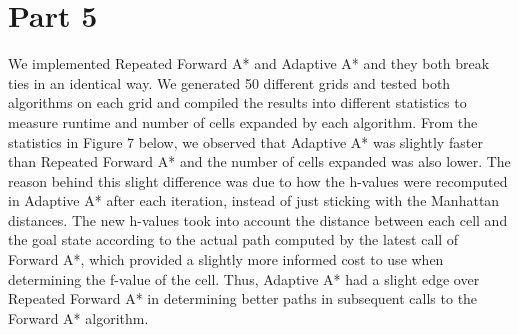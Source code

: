 \documentclass[12pt, letterpaper]{article}
\begin{document}
\section*{Part 5}
We implemented Repeated Forward A* and Adaptive A* and they both break ties in an identical way. We generated 50 different grids and tested both algorithms on each grid and compiled the results into different statistics to measure runtime and number of cells expanded by each algorithm. From the statistics in Figure 7 below, we observed that Adaptive A* was slightly faster than Repeated Forward A* and the number of cells expanded was also lower. The reason behind this slight difference was due to how the h-values were recomputed in Adaptive A* after each iteration, instead of just sticking with the Manhattan distances. The new h-values took into account the distance between each cell and the goal state according to the actual path computed by the latest call of Forward A*, which provided a slightly more informed cost to use when determining the f-value of the cell. Thus, Adaptive A* had a slight edge over Repeated Forward A* in determining better paths in subsequent calls to the Forward A* algorithm. 
\end{document}
